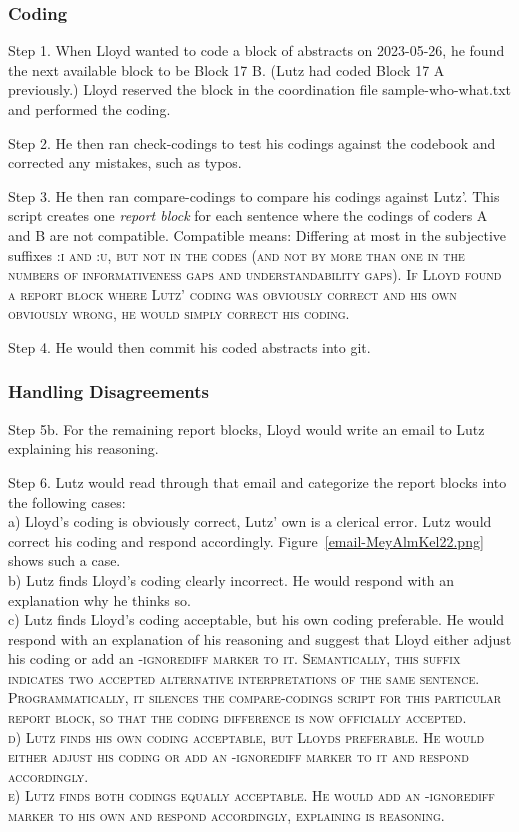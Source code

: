 \documentclass[10pt,journal,compsoc]{IEEEtran}
\newcommand{\Cb}[1]{\bgroup\scshape #1\egroup}  %
\newcommand{\Prg}[1]{\bgroup\ttfamily #1\egroup}  %
\begin{document}
\subsubsection{Coding}

\indent Step 1. When Lloyd wanted to code a block of abstracts on 2023-05-26,
he found the next available block to be Block 17 B.
(Lutz had coded Block 17 A previously.)
Lloyd reserved the block in the coordination file \Prg{sample-who-what.txt}
and performed the coding.

Step 2. He then ran \Prg{check-codings} to test his codings
against the codebook and corrected any mistakes, such as typos.

Step 3. He then ran \Prg{compare-codings} to compare his codings against Lutz'.
This script creates one \emph{report block} for each sentence where the codings
of coders A and B are not compatible.
Compatible means: Differing at most in the subjective suffixes \Cb{:i} and \Cb{:u}, but not in the codes
(and not by more than one in the numbers of informativeness gaps and understandability gaps).
If Lloyd found a report block where Lutz' coding was obviously correct and his own
obviously wrong, he would simply correct his coding.

Step 4. He would then commit his coded abstracts into git.


\subsubsection{Handling Disagreements}


\indent Step 5b. For the remaining report blocks, Lloyd would write an email to Lutz explaining his reasoning.

Step 6. Lutz would read through that email and categorize the report blocks into the following cases:\\
a) Lloyd's coding is obviously correct, Lutz' own is a clerical error.
Lutz would correct his coding and respond accordingly.
Figure~\ref{email-MeyAlmKel22.png} shows such a case.\\
b) Lutz finds Lloyd's coding clearly incorrect.
He would respond with an explanation why he thinks so.\\
c) Lutz finds Lloyd's coding acceptable, but his own coding preferable.
He would respond with an explanation of his reasoning and suggest that Lloyd
either adjust his coding or add an \Cb{-ignorediff} marker to it.
Semantically, this suffix indicates two accepted alternative interpretations of the same sentence.
Programmatically, it silences the \Prg{compare-codings} script for this particular report block,
so that the coding difference is now officially accepted.\\
d) Lutz finds his own coding acceptable, but Lloyds preferable.
He would either adjust his coding or add an \Cb{-ignorediff} marker to it
and respond accordingly.\\
e) Lutz finds both codings equally acceptable.
He would add an \Cb{-ignorediff} marker to his own
and respond accordingly, explaining is reasoning.
\end{document}
